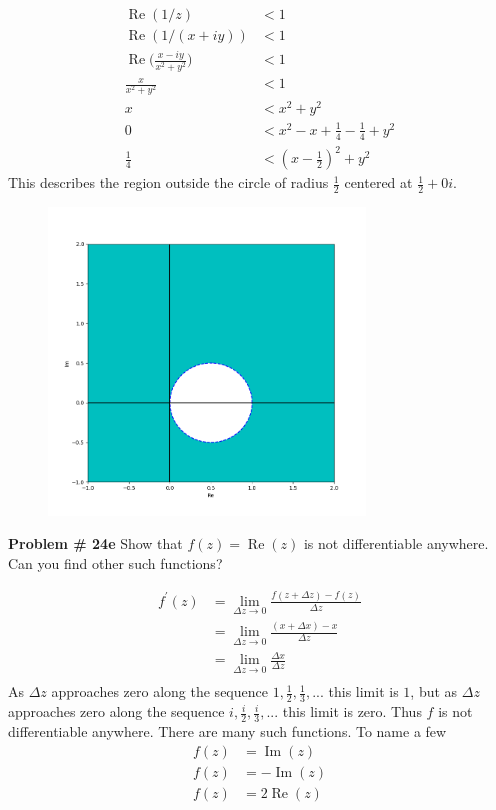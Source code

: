 \documentclass[12pt]{article}
\newcommand{\problem}[1]{\hspace{-4 ex} \large \textbf{Problem #1} }
\renewcommand{\Re}{\operatorname{Re}}
\renewcommand{\Im}{\operatorname{Im}}
\begin{document}
	\begin{align*}
		\Re(1/z) &< 1\\
		\Re(1/(x+iy)) &< 1\\
		\Re \Bigg(\frac{x-iy}{x^2+y^2} \Bigg) &< 1 \\
		\frac{x}{x^2+y^2} &< 1 \\
		x &< x^2 + y^2 \\
		0 &< x^2 - x + \tfrac{1}{4} - \tfrac{1}{4} + y^2 \\
		\tfrac{1}{4} &< (x-\tfrac{1}{2})^2 +y^2
	\end{align*}
	This describes the region outside the circle of radius $\tfrac{1}{2}$ centered at $\tfrac{1}{2} + 0i$.
	\begin{figure}[H]
		\includegraphics[width=0.75\textwidth]{hw10_figure_2}
		\centering
	\end{figure}

\bigbreak
\problem{\# 24e} Show that $f(z) = \Re(z)$ is not differentiable anywhere. Can you find other such functions? \bigbreak

	\begin{align*}
		f^\prime(z) & = \lim_{\Delta z \to 0} \frac{f(z+\Delta z) - f(z)}{\Delta z} \\
		& = \lim_{\Delta z \to 0} \frac{(x+\Delta x) - x}{\Delta z} \\
		& = \lim_{\Delta z \to 0} \frac{\Delta x}{\Delta z} \\
	\end{align*}
	As $\Delta z$ approaches zero along the sequence $1, \tfrac{1}{2}, \tfrac{1}{3}, ...$ this limit is $1$, but as $\Delta z$ approaches zero along the sequence $i, \tfrac{i}{2}, \tfrac{i}{3}, ...$ this limit is zero. Thus $f$ is not differentiable anywhere. There are many such functions. To name a few
	\begin{align*}
		f(z) &= \Im(z) \\
		f(z) &= -\Im(z) \\
		f(z) &= 2\Re(z) \\
	\end{align*}
\end{document}
